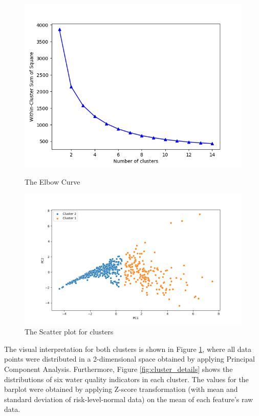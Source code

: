 \documentclass[a4paper,11pt]{report}
\begin{document}
\begin{figure}[H]
  \centering
  \begin{minipage}{0.45\textwidth}
    \includegraphics[width=\linewidth]{images/Kmeans_Elbow.png}
    \caption{The Elbow Curve}
    \label{fig:K_Elbow}
  \end{minipage}
  \hfill
  \begin{minipage}{0.45\textwidth}
    \includegraphics[width=\linewidth]{images/Kmeans_scatter.png}
    \caption{The Scatter plot for clusters}
    \label{fig:K_scatter}
  \end{minipage}
\end{figure}

The visual interpretation for both clusters is shown in Figure \ref{fig:K_scatter}, where all data points were distributed in a 2-dimensional space obtained by applying Principal Component Analysis. Furthermore, Figure \ref{fig:cluster_details} shows the distributions of six water quality indicators in each cluster. The values for the barplot were obtained by applying Z-score transformation (with mean and standard deviation of risk-level-normal data) on the mean of each feature's raw data.
\end{document}

